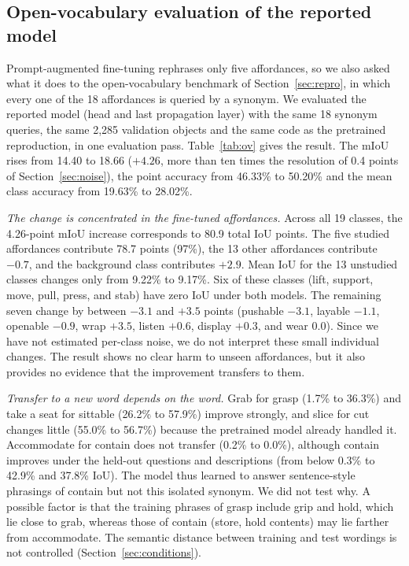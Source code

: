 \documentclass[conference]{IEEEtran}
\begin{document}
\subsection{Open-vocabulary evaluation of the reported model}
\label{sec:ov}
Prompt-augmented fine-tuning rephrases only five affordances, so we also asked what it does to the open-vocabulary benchmark of Section~\ref{sec:repro}, in which every one of the 18 affordances is queried by a synonym. We evaluated the reported model (head and last propagation layer) with the same 18 synonym queries, the same 2,285 validation objects and the same code as the pretrained reproduction, in one evaluation pass. Table~\ref{tab:ov} gives the result. The mIoU rises from 14.40 to 18.66 ($+4.26$, more than ten times the resolution of 0.4 points of Section~\ref{sec:noise}), the point accuracy from 46.33\% to 50.20\% and the mean class accuracy from 19.63\% to 28.02\%.

\emph{The change is concentrated in the fine-tuned affordances.} Across all 19 classes, the 4.26-point mIoU increase corresponds to 80.9 total IoU points. The five studied affordances contribute 78.7 points (97\%), the 13 other affordances contribute $-0.7$, and the background class contributes $+2.9$. Mean IoU for the 13 unstudied classes changes only from 9.22\% to 9.17\%. Six of these classes (lift, support, move, pull, press, and stab) have zero IoU under both models. The remaining seven change by between $-3.1$ and $+3.5$ points (pushable $-3.1$, layable $-1.1$, openable $-0.9$, wrap $+3.5$, listen $+0.6$, display $+0.3$, and wear $0.0$). Since we have not estimated per-class noise, we do not interpret these small individual changes. The result shows no clear harm to unseen affordances, but it also provides no evidence that the improvement transfers to them.

\emph{Transfer to a new word depends on the word.} Grab for grasp (1.7\% to 36.3\%) and take a seat for sittable (26.2\% to 57.9\%) improve strongly, and slice for cut changes little (55.0\% to 56.7\%) because the pretrained model already handled it. Accommodate for contain does not transfer (0.2\% to 0.0\%), although contain improves under the held-out questions and descriptions (from below 0.3\% to 42.9\% and 37.8\% IoU). The model thus learned to answer sentence-style phrasings of contain but not this isolated synonym. We did not test why. A possible factor is that the training phrases of grasp include grip and hold, which lie close to grab, whereas those of contain (store, hold contents) may lie farther from accommodate. The semantic distance between training and test wordings is not controlled (Section~\ref{sec:conditions}).
\end{document}
